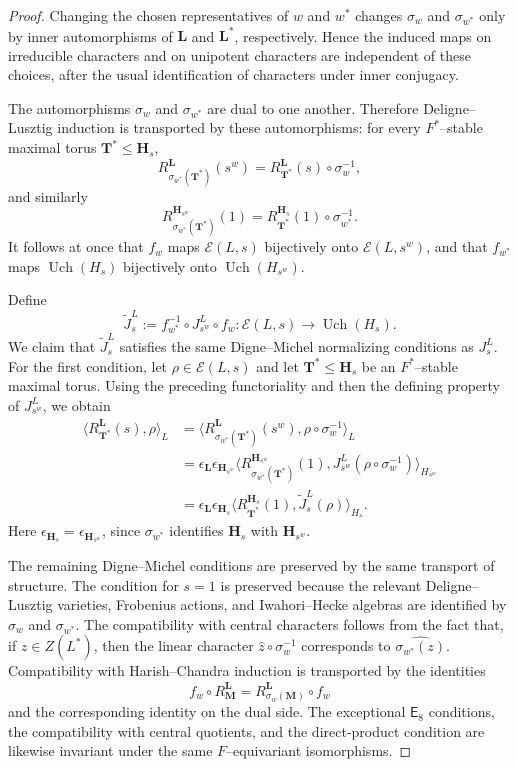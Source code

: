\documentclass{amsart}
\theoremstyle{plain}
\numberwithin{equation}{section}
\theoremstyle{definition}
\newcommand{\Uch}{\operatorname{Uch}}
\newcommand{\bL}{\mathbf{L}}
\newcommand{\bM}{\mathbf{M}}
\newcommand{\bT}{\mathbf{T}}
\newcommand{\bH}{\mathbf{H}}
\begin{document}
\begin{proof}
Changing the chosen representatives of $w$ and $w^*$ changes
$\sigma_w$ and $\sigma_{w^*}$ only by inner automorphisms of $\bL$ and
$\bL^*$, respectively.  Hence the induced maps on irreducible characters and
on unipotent characters are independent of these choices, after the usual
identification of characters under inner conjugacy.

The automorphisms $\sigma_w$ and $\sigma_{w^*}$ are dual to one another.
Therefore Deligne--Lusztig induction is transported by these automorphisms:
for every $F^*$--stable maximal torus $\bT^*\leq \bH_s$,
\[
R_{\sigma_{w^*}(\bT^*)}^{\bL}(s^w)
=
R_{\bT^*}^{\bL}(s)\circ\sigma_w^{-1},
\]
and similarly
\[
R_{\sigma_{w^*}(\bT^*)}^{\bH_{s^w}}(1)
=
R_{\bT^*}^{\bH_s}(1)\circ\sigma_{w^*}^{-1}.
\]
It follows at once that $f_w$ maps $\mathcal{E}(L,s)$ bijectively onto
$\mathcal{E}(L,s^w)$, and that $f_{w^*}$ maps $\Uch(H_s)$ bijectively onto
$\Uch(H_{s^w})$.

Define
\[
\widetilde J_s^L
:=
f_{w^*}^{-1}\circ J_{s^w}^{L}\circ f_w
:
\mathcal{E}(L,s)\longrightarrow \Uch(H_s).
\]
We claim that $\widetilde J_s^L$ satisfies the same Digne--Michel
normalizing conditions as $J_s^L$.  For the first condition, let
$\rho\in\mathcal{E}(L,s)$ and let $\bT^*\leq \bH_s$ be an $F^*$--stable
maximal torus.  Using the preceding functoriality and then the defining
property of $J_{s^w}^L$, we obtain
\begin{align*}
\bigl\langle R_{\bT^*}^{\bL}(s),\rho\bigr\rangle_L
&=
\bigl\langle
R_{\sigma_{w^*}(\bT^*)}^{\bL}(s^w),
\rho\circ\sigma_w^{-1}
\bigr\rangle_L                                      \\
&=
\epsilon_{\bL}\epsilon_{\bH_{s^w}}
\bigl\langle
R_{\sigma_{w^*}(\bT^*)}^{\bH_{s^w}}(1),
J_{s^w}^L(\rho\circ\sigma_w^{-1})
\bigr\rangle_{H_{s^w}}                              \\
&=
\epsilon_{\bL}\epsilon_{\bH_s}
\bigl\langle
R_{\bT^*}^{\bH_s}(1),
\widetilde J_s^L(\rho)
\bigr\rangle_{H_s}.
\end{align*}
Here $\epsilon_{\bH_s}=\epsilon_{\bH_{s^w}}$, since
$\sigma_{w^*}$ identifies $\bH_s$ with $\bH_{s^w}$.

The remaining Digne--Michel conditions are preserved by the same transport
of structure.  The condition for $s=1$ is preserved because the relevant
Deligne--Lusztig varieties, Frobenius actions, and Iwahori--Hecke algebras
are identified by $\sigma_w$ and $\sigma_{w^*}$.  The compatibility with
central characters follows from the fact that, if $z\in Z(L^*)$, then the
linear character $\widehat z\circ\sigma_w^{-1}$ corresponds to
$\widehat{\sigma_{w^*}(z)}$.  Compatibility with Harish--Chandra induction
is transported by the identities
\[
f_w\circ R_{\bM}^{\bL}
=
R_{\sigma_w(\bM)}^{\bL}\circ f_w
\]
and the corresponding identity on the dual side.  The exceptional
$\mathsf E_8$ conditions, the compatibility with central quotients, and the
direct-product condition are likewise invariant under the same
$F$--equivariant isomorphisms.


\end{proof}
\end{document}
